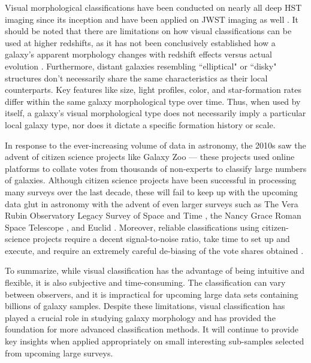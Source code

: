 Visual morphological classifications have been conducted on nearly all deep HST imaging since its inception \citep[e.g.,][]{vdb_96, lee_13, kartaltepe_15} and have been applied on JWST imaging as well \citep[e.g.,][]{kartaltepe_23}. It should be noted that there are limitations on how visual classifications can be used at higher redshifts, as it has not been conclusively established how a galaxy's apparent morphology changes with redshift effects versus actual evolution \citep[e.g.,][]{morph_review}. Furthermore, distant galaxies resembling ``elliptical" or ``disky" structures don't necessarily share the same characteristics as their local counterparts. Key features like size, light profiles, color, and star-formation rates differ within the same galaxy morphological type over time. Thus, when used by itself, a galaxy's visual morphological type does not necessarily imply a particular local galaxy type, nor does it dictate a specific formation history or scale.

In response to the ever-increasing volume of data in astronomy, the 2010s saw the advent of citizen science projects like Galaxy Zoo \citep{gzoo_original} --- these projects used online platforms to collate votes from thousands of non-experts to classify large numbers of galaxies. Although citizen science projects have been successful in processing many surveys over the last decade, these will fail to keep up with the upcoming data glut in astronomy with the advent of even larger surveys such as The Vera Rubin Observatory Legacy Survey of Space and Time \citep[LSST;][]{lsst}, the Nancy Grace Roman Space Telescope \citep[NGRST;][]{ngrst}, and Euclid \citep{euclid}. Moreover, reliable  classifications using citizen-science projects require a decent signal-to-noise ratio, take time to set up and execute, and require an extremely careful de-biasing of the vote shares obtained \citep[e.g.,][]{gzoo_original,gzoo_candels}. 

To summarize, while visual classification has the advantage of being intuitive and flexible, it is also subjective and time-consuming. The classification can vary between observers, and it is impractical for upcoming large data sets containing billions of galaxy samples. Despite these limitations, visual classification has played a crucial role in studying galaxy morphology and has provided the foundation for more advanced classification methods. It will continue to provide key insights when applied appropriately on small interesting sub-samples selected from upcoming large surveys. 

